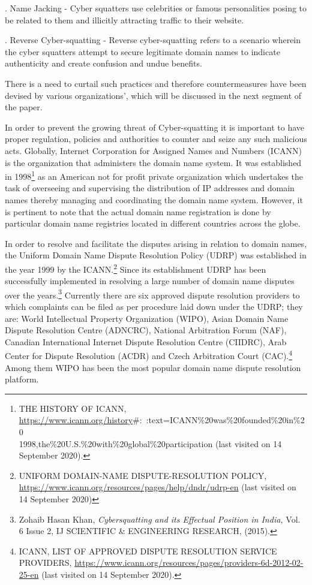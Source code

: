 \begin{multicols}{2}
. Name Jacking - Cyber squatters use celebrities or famous personalities posing to be related
to them and illicitly attracting traffic to their website.

. Reverse Cyber-squatting - Reverse cyber-squatting refers to a scenario wherein the cyber
squatters attempt to secure legitimate domain names to indicate authenticity and create
confusion and undue benefits.

\noi
There is a need to curtail such practices and therefore countermeasures have been devised by
various organizations’, which will be discussed in the next segment of the paper.


\noi
In order to prevent the growing threat of Cyber-squatting it is important to have proper
regulation, policies and authorities to counter and seize any such malicious acts. Globally,
Internet Corporation for Assigned Names and Numbers (ICANN) is the organization that
administers the domain name system. It was established in 1998\footnote{THE HISTORY OF ICANN, \url{https://www.icann.org/history}\#:~:text=ICANN\%20was\%20founded\%20in\%20\\1998,the\%20U.S.\%20with\%20global\%20participation (last visited on 14 September 2020).} as an American not for profit private organization which undertakes the task of overseeing and supervising the
distribution of IP addresses and domain names thereby managing and coordinating the
domain name system. However, it is pertinent to note that the actual domain name
registration is done by particular domain name registries located in different countries across
the globe.

\noi
In order to resolve and facilitate the disputes arising in relation to domain names, the Uniform
Domain Name Dispute Resolution Policy (UDRP) was established in the year 1999 by the
ICANN.\footnote{UNIFORM DOMAIN-NAME DISPUTE-RESOLUTION POLICY,
\url{https://www.icann.org/resources/pages/help/dndr/udrp-en} (last visited on 14 September 2020)} Since its establishment UDRP has been successfully implemented in resolving a
large number of domain name disputes over the years.\footnote{Zohaib Hasan Khan, \textit{Cybersquatting and its Effectual Position in India,} Vol. 6 Issue 2, IJ SCIENTIFIC \& ENGINEERING RESEARCH, (2015).} Currently there are six approved
dispute resolution providers to which complaints can be filed as per procedure laid down
under the UDRP; they are: World Intellectual Property Organization (WIPO), Asian Domain
Name Dispute Resolution Centre (ADNCRC), National Arbitration Forum (NAF), Canadian
International Internet Dispute Resolution Centre (CIIDRC), Arab Center for Dispute
Resolution (ACDR) and Czech Arbitration Court (CAC).\footnote{ICANN, LIST OF APPROVED DISPUTE RESOLUTION SERVICE PROVIDERS, \url{https://www.icann.org/resources/pages/providers-6d-2012-02-25-en} (last visited on 14 September 2020).} Among them WIPO has been the most popular domain name dispute resolution platform.


\end{multicols}
